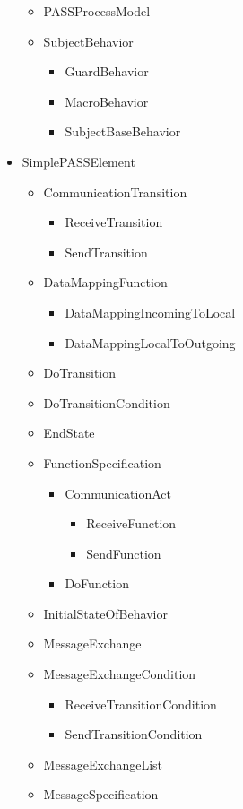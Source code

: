 \begin{itemize}
\begin{itemize}
	\item PASSProcessModel
	\item SubjectBehavior
	\begin{itemize}
		\item GuardBehavior
		\item MacroBehavior
		\item SubjectBaseBehavior
	\end{itemize}
\end{itemize}
	
\item SimplePASSElement
\begin{itemize}
	\item CommunicationTransition
	\begin{itemize}
		\item ReceiveTransition
		\item SendTransition
	\end{itemize}
	\item DataMappingFunction
	\begin{itemize}
		\item DataMappingIncomingToLocal
		\item DataMappingLocalToOutgoing
	\end{itemize}
	\item DoTransition
	\item DoTransitionCondition
	\item EndState
	\item FunctionSpecification
	\begin{itemize}
		\item CommunicationAct
		\begin{itemize}
			\item ReceiveFunction
			\item SendFunction
		\end{itemize}
		\item DoFunction
	\end{itemize}
	\item InitialStateOfBehavior
	\item MessageExchange
	\item MessageExchangeCondition
	\begin{itemize}
		\item ReceiveTransitionCondition
		\item SendTransitionCondition
	\end{itemize}
	\item MessageExchangeList
	\item MessageSpecification

\end{itemize}
\end{itemize}
